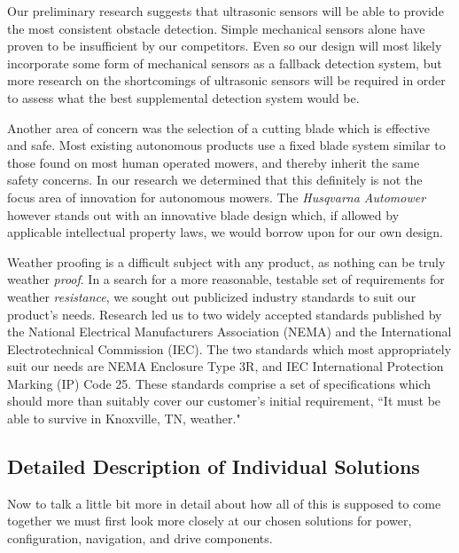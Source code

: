 \documentclass[11pt,letterpaper]{article}
\begin{document}
Our preliminary research suggests that ultrasonic sensors will be able to
provide the most consistent obstacle detection.  Simple mechanical sensors alone
have proven to be insufficient by our competitors. Even so our design will most
likely incorporate some form of mechanical sensors as a fallback detection
system, but more research on the shortcomings of ultrasonic sensors will be
required in order to assess what the best supplemental detection system would
be.

Another area of concern was the selection of a cutting blade which is effective
and safe.  Most existing autonomous products use a fixed blade system similar to
those found on most human operated mowers, and thereby inherit the same safety
concerns.  In our research we determined that this definitely is not the focus
area of innovation for autonomous mowers. The \textit{Husqvarna
Automower}\autocite{automower} however stands out with an innovative blade
design which, if allowed by applicable intellectual property laws, we would
borrow upon for our own design.

Weather proofing is a difficult subject with any product, as nothing can be
truly weather \textit{proof}.  In a search for a more reasonable, testable set
of requirements for weather \textit{resistance}, we sought out publicized
industry standards to suit our product's needs.  Research led us to two widely
accepted standards published by the National Electrical Manufacturers
Association (NEMA) and the International Electrotechnical Commission (IEC).  The
two standards which most appropriately suit our needs are NEMA Enclosure Type
3R\autocite{nema3r}, and IEC International Protection Marking (IP) Code
25.\autocite{ip25}  These standards comprise a set of specifications which
should more than suitably cover our customer's initial requirement, ``It must be
able to survive in Knoxville, TN, weather."

\subsection{Detailed Description of Individual Solutions}
Now to talk a little bit more in detail about how all of this is supposed to
come together we must first look more closely at our chosen solutions for power,
configuration, navigation, and drive components. 
\end{document}
